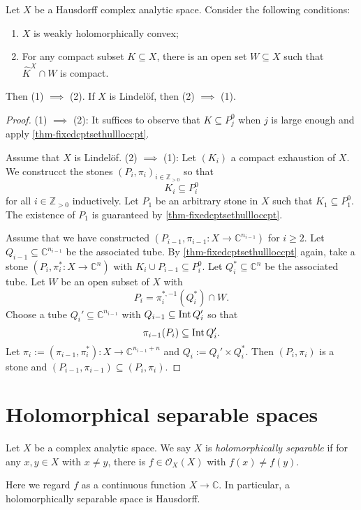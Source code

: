 \begin{thm}\label{thm-weaklyholconvchar}
    Let $X$ be a Hausdorff complex analytic space. Consider the following conditions:
    \begin{enumerate}
        \item $X$ is weakly holomorphically convex;
        \item For any compact subset $K\subseteq X$, there is an open set $W\subseteq X$ such that $\hat{K}^X\cap W$ is compact.
    \end{enumerate}
    Then (1) $\implies$ (2). If $X$ is Lindelöf, then (2) $\implies$ (1).
\end{thm}
\begin{proof}
    (1) $\implies$ (2): It suffices to observe that $K\subseteq P_j^0$ when $j$ is large enough and apply \cref{thm-fixedcptsethullloccpt}.

    Assume that $X$ is Lindelöf.
    (2) $\implies$ (1): 
    Let $(K_i)$ a compact exhaustion of $X$. We construcct the stones $(P_i,\pi_i)_{i\in \mathbb{Z}_{>0}}$ so that 
    \[
        K_i\subseteq P_i^0
    \] 
    for all $i\in \mathbb{Z}_{>0}$
    inductively. Let $P_1$ be an arbitrary stone in $X$ such that $K_1\subseteq P_1^0$. The existence of $P_1$ is guaranteed by \cref{thm-fixedcptsethullloccpt}.

    Assume that we have constructed $(P_{i-1},\pi_{i-1}:X\rightarrow  \mathbb{C}^{n_{i-1}})$ for $i\geq 2$. Let $Q_{i-1}\subseteq \mathbb{C}^{n_{i-1}}$ be the associated tube. By   \cref{thm-fixedcptsethullloccpt} again, take a stone $(P_i,\pi_i^*:X\rightarrow \mathbb{C}^n)$ with $K_i\cup P_{i-1}\subseteq P_i^0$. Let $Q_i^*\subseteq \mathbb{C}^n$ be the associated tube. Let $W$ be an open subset of $X$ with 
    \[
        P_i=\pi_i^{*,-1}(Q_i^*)\cap W.  
    \]
    Choose a tube $Q_i'\subseteq \mathbb{C}^{n_{i-1}}$ with $Q_{i-1}\subseteq \operatorname{Int} Q_i'$ so that 
    \[
        \pi_{i-1}(P_i)\subseteq \operatorname{Int} Q_i'.
    \]
    Let $\pi_i:=(\pi_{i-1},\pi_i^*):X\rightarrow \mathbb{C}^{n_{i-1}+n}$ and $Q_i:=Q_i'\times Q_i^*$. Then $(P_i,\pi_i)$ is a stone and $(P_{i-1},\pi_{i-1})\subseteq (P_i,\pi_i)$.
\end{proof}


\section{Holomorphical separable spaces}
\begin{definition}
    Let $X$ be a complex analytic space. We say $X$ is \emph{holomorphically separable} if for any $x,y\in X$ with $x\neq y$, there is $f\in \mathcal{O}_X(X)$ with $f(x)\neq f(y)$.
\end{definition}
Here we regard $f$ as a continuous function $X\rightarrow \mathbb{C}$. In particular, a holomorphically separable space is Hausdorff.


